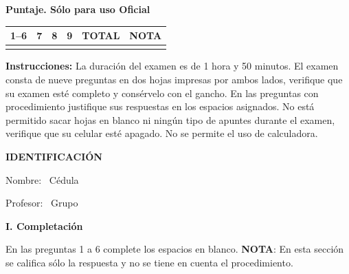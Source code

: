 \documentclass[11pt]{article}
\begin{document}
\examheader

\vspace{4pt}
\noindent
\begin{minipage}[t]{0.62\linewidth}
\textbf{Puntaje. Sólo para uso Oficial}\\[4pt]
\begin{tabular}{|c|c|c|c|c|c|}
\hline
1--6 & 7 & 8 & 9 & \textbf{TOTAL} & \textbf{NOTA} \\ \hline
 & & & & & \\ \hline
\end{tabular}
\end{minipage}

\vspace{6pt}
\noindent\textbf{Instrucciones:} La duración del examen es de 1 hora y 50 minutos. El examen consta de nueve preguntas en dos hojas impresas por ambos lados, verifique que su examen esté completo y consérvelo con el gancho. En las preguntas con procedimiento justifique sus respuestas en los espacios asignados. No está permitido sacar hojas en blanco ni ningún tipo de apuntes durante el examen, verifique que su celular esté apagado. No se permite el uso de calculadora.

\vspace{6pt}
\noindent\textbf{IDENTIFICACIÓN}

\vspace{8pt}
\noindent Nombre: \dotfill\ Cédula \dotfill

\vspace{4pt}
\noindent Profesor: \dotfill\ Grupo \dotfill

\vspace{10pt}
\begin{center}\textbf{I. Completación}\end{center}
\noindent En las preguntas 1 a 6 complete los espacios en blanco. \textbf{NOTA}: En esta sección se califica sólo la respuesta y no se tiene en cuenta el procedimiento.
\end{document}
